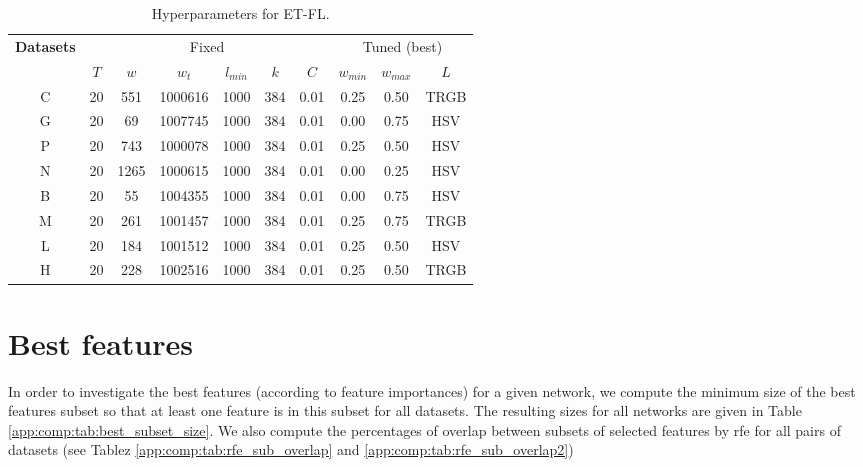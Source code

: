 \begin{table}
	\centering
	\begin{tabular}{|c|c|c|c|c|c|c|c|c|c|}
    	\hline
        \multirow{2}{*}{\textbf{Datasets}} & \multicolumn{6}{c|}{Fixed} & \multicolumn{3}{c|}{Tuned (best)} \\ 
     	\cline{2-10}
		 & $T$ & $w$ & $w_t$ & $l_{min}$ & $k$ & $C$ & $w_{min}$ & $w_{max}$ & $L$ \\ 
     	\hline
        C & 20 &  551 & 1000616 & 1000 & 384 & 0.01 & 0.25 & 0.50 & TRGB \\
        G & 20 &   69 & 1007745 & 1000 & 384 & 0.01 & 0.00 & 0.75 &  HSV \\
        P & 20 &  743 & 1000078 & 1000 & 384 & 0.01 & 0.25 & 0.50 &  HSV \\
        N & 20 & 1265 & 1000615 & 1000 & 384 & 0.01 & 0.00 & 0.25 &  HSV \\
        B & 20 &   55 & 1004355 & 1000 & 384 & 0.01 & 0.00 & 0.75 &  HSV \\
        M & 20 &  261 & 1001457 & 1000 & 384 & 0.01 & 0.25 & 0.75 & TRGB \\
        L & 20 &  184 & 1001512 & 1000 & 384 & 0.01 & 0.25 & 0.50 &  HSV \\
        H & 20 &  228 & 1002516 & 1000 & 384 & 0.01 & 0.25 & 0.50 & TRGB \\
     	\hline
	\end{tabular}
    \caption{Hyperparameters for ET-FL.}
    \label{app:comp:tab:hyper_etfl}
\end{table}

\section{Best features}
\label{app:comp:sec:bestfeatures}

In order to investigate the best features (according to feature importances) for a given network, we compute the minimum size of the best features subset so that at least one feature is in this subset for all datasets. The resulting sizes for all networks are given in Table \ref{app:comp:tab:best_subset_size}. We also compute the percentages of overlap between subsets of selected features by \acrshort{rfe} for all pairs of datasets (see Tablez \ref{app:comp:tab:rfe_sub_overlap} and \ref{app:comp:tab:rfe_sub_overlap2})

